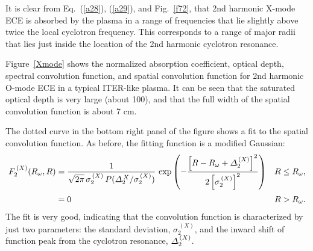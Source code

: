\documentclass[12pt,prb,aps]{revtex4-1}
\begin{document}
 It is clear from Eq.~(\ref{a28}),
(\ref{a29}), and Fig.~\ref{f72}, that 2nd harmonic X-mode  ECE is absorbed by the plasma in a range of frequencies that lie slightly above twice the local cyclotron frequency. This corresponds to a range of major radii that lies just inside the location of the 2nd harmonic cyclotron resonance. 

Figure~\ref{Xmode} shows the normalized absorption coefficient, optical depth, spectral convolution function, and spatial convolution function for
2nd harmonic O-mode ECE in a typical ITER-like plasma. It can be seen that the saturated optical depth is very  large (about 100), and that the full 
width of the spatial convolution function is about 7 cm.

  The dotted curve in the bottom right panel of the figure shows a fit to the
spatial convolution function. As before, the fitting function is a modified Gaussian:
\begin{align}
F_2^{\,(X)}(R_\omega,R)&= \frac{1}{\sqrt{2\pi}\,\sigma_2^{\,(X)} \,P({\mit\Delta}_2^{\,X}/\sigma_2^{\,(X)})}\,
\exp\left(-\frac{\left[R-R_\omega+{\mit\Delta}_2^{\,(X)}\right]^2}{2\left[\sigma_2^{\,(X)}\right]^2}\right)&R\leq R_\omega,\\[0.5ex]
&= 0& R>R_\omega.
\end{align}
  The fit is very good, indicating that the convolution function 
is characterized by just two parameters: the standard deviation, $\sigma_2^{\,(X)}$, and the inward shift
of function peak from the cyclotron resonance, ${\mit\Delta}_2^{\,(X)}$. 
\end{document}
